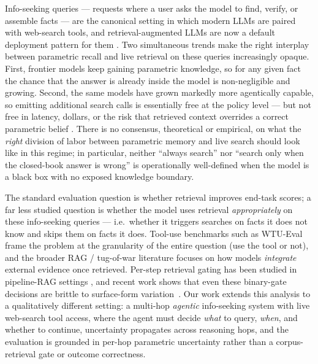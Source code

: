 \documentclass[10pt,letterpaper]{article}
\begin{document}
Info-seeking queries --- requests where a user asks the model to find, verify, or
assemble facts --- are the canonical setting in which modern LLMs are paired with
web-search tools, and retrieval-augmented LLMs are now a default deployment pattern for
them \citep{huang2024rag}. Two simultaneous trends make the right interplay between
parametric recall and live retrieval on these queries increasingly opaque. First,
frontier models keep gaining parametric knowledge, so for any given fact the chance that
the answer is already inside the model is non-negligible and growing. Second, the same
models have grown markedly more agentically capable, so emitting additional search calls
is essentially free at the policy level --- but not free in latency, dollars, or the
risk that retrieved context overrides a correct parametric belief
\citep{wu2024clasheval,tao2024context}. There is no consensus, theoretical or empirical,
on what the \emph{right} division of labor between parametric memory and live search
should look like in this regime; in particular, neither ``always search'' nor ``search
only when the closed-book answer is wrong'' is operationally well-defined when the model
is a black box with no exposed knowledge boundary.

The standard evaluation question is whether retrieval improves end-task scores; a far
less studied question is whether the model uses retrieval \emph{appropriately} on these
info-seeking queries --- i.e.\ whether it triggers searches on facts it does not know
and skips them on facts it does. Tool-use benchmarks such as WTU-Eval \citep{wtu2024}
frame the problem at the granularity of the entire question (use the tool or not), and
the broader RAG / tug-of-war literature
\citep{cheng2024interplay,wu2024clasheval,tao2024context,kim2025reliability,farahani2024deciphering}
focuses on how models \emph{integrate} external evidence once retrieved.
Per-step retrieval gating has been studied in pipeline-RAG settings
\citep{flare2023,selfrag2024,seakr2025,deeprag2025,hiprag2025}, and recent work shows
that even these binary-gate decisions are brittle to surface-form variation~\citep{howask2026}.
Our work extends this analysis to a qualitatively different setting: a multi-hop
\emph{agentic} info-seeking system with live web-search tool access, where the agent
must decide \emph{what} to query, \emph{when}, and whether to continue, uncertainty
propagates across reasoning hops, and the evaluation is grounded in per-hop parametric
uncertainty rather than a corpus-retrieval gate or outcome correctness.
\end{document}
